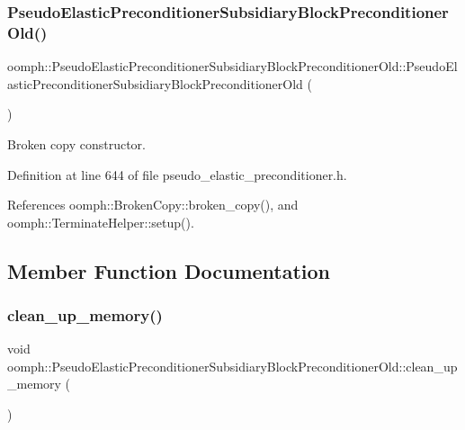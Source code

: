 \subsubsection{\texorpdfstring{Pseudo\+Elastic\+Preconditioner\+Subsidiary\+Block\+Preconditioner\+Old()}{PseudoElasticPreconditionerSubsidiaryBlockPreconditionerOld()}\hspace{0.1cm}{\footnotesize\ttfamily [2/2]}}
{\footnotesize\ttfamily oomph\+::\+Pseudo\+Elastic\+Preconditioner\+Subsidiary\+Block\+Preconditioner\+Old\+::\+Pseudo\+Elastic\+Preconditioner\+Subsidiary\+Block\+Preconditioner\+Old (\begin{DoxyParamCaption}\item[{const \hyperlink{classoomph_1_1PseudoElasticPreconditionerSubsidiaryBlockPreconditionerOld}{Pseudo\+Elastic\+Preconditioner\+Subsidiary\+Block\+Preconditioner\+Old} \&}]{ }\end{DoxyParamCaption})\hspace{0.3cm}{\ttfamily [inline]}}



Broken copy constructor. 



Definition at line 644 of file pseudo\+\_\+elastic\+\_\+preconditioner.\+h.



References oomph\+::\+Broken\+Copy\+::broken\+\_\+copy(), and oomph\+::\+Terminate\+Helper\+::setup().



\subsection{Member Function Documentation}
\mbox{\label{classoomph_1_1PseudoElasticPreconditionerSubsidiaryBlockPreconditionerOld_a8bb2215735df1a583b4bc1b92bded1e6}} 
\subsubsection{\texorpdfstring{clean\+\_\+up\+\_\+memory()}{clean\_up\_memory()}}
{\footnotesize\ttfamily void oomph\+::\+Pseudo\+Elastic\+Preconditioner\+Subsidiary\+Block\+Preconditioner\+Old\+::clean\+\_\+up\+\_\+memory (\begin{DoxyParamCaption}{ }\end{DoxyParamCaption})\hspace{0.3cm}{\ttfamily [virtual]}}



